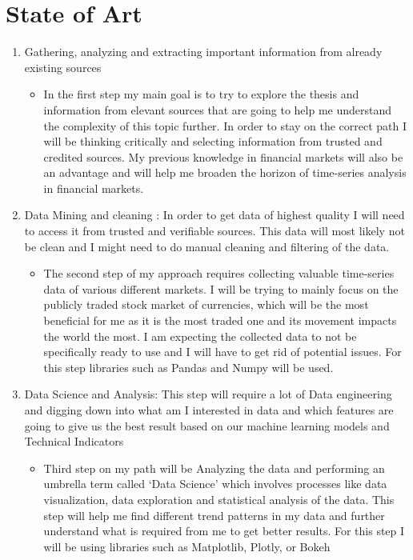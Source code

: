 \documentclass{imc-inf}
\begin{document}
\section{State of Art}
\begin{enumerate}
	\item Gathering, analyzing and extracting important information from
	already existing sources
		\begin{itemize}
			\item  In the first step my main goal is to try to explore the thesis and information
			from elevant sources that are going to help me understand the complexity of
			this topic further. In order to stay on the correct path I will be thinking critically
			and selecting information from trusted and credited sources. My previous
			knowledge in financial markets will also be an advantage and will help me
			broaden the horizon of time-series analysis in financial markets.
		\end{itemize}

	\item Data Mining and cleaning : In order to get data of highest quality I will need
	to access it from trusted and verifiable sources. This data will most likely not
	be clean and I might need to do manual cleaning and filtering of the data.
		\begin{itemize}
			\item The second step of my approach requires collecting valuable time-series data
			of various different markets. I will be trying to mainly focus on the
			publicly traded stock market of currencies, which will be the most beneficial for me as it
			is the most traded one and its movement impacts the world the most. I am
			expecting the collected data to not be specifically ready to use and I will have
			to get rid of potential issues. For this step libraries such as Pandas and Numpy will be used.
		\end{itemize}

	\item Data Science and Analysis: This step will require a lot of Data engineering
	and digging down into what am I interested in data and which features are
	going to give us the best result based on our machine learning models and Technical Indicators
		\begin{itemize}
			\item Third step on my path will be Analyzing the data and performing an umbrella
			term called ‘Data Science’ which involves processes like data visualization,
			data exploration and statistical analysis of the data. This step will help me find
			different trend patterns in my data and further understand what is required
			from me to get better results. For this step I will be using libraries such as
			Matplotlib, Plotly, or Bokeh 
		\end{itemize}


\end{enumerate}
\end{document}
